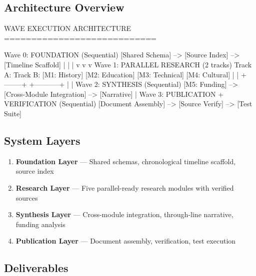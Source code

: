 \documentclass[11pt,letterpaper]{article}
\begin{document}
\subsection{Architecture Overview}

\begin{asciibox}
WAVE EXECUTION ARCHITECTURE
============================

Wave 0: FOUNDATION (Sequential)
  [Shared Schema] --> [Source Index] --> [Timeline Scaffold]
       |                   |                    |
       v                   v                    v
Wave 1: PARALLEL RESEARCH (2 tracks)
  Track A:                  Track B:
  [M1: History]             [M2: Education]
  [M3: Technical]           [M4: Cultural]
       |                         |
       +--------+    +-----------+
                |    |
Wave 2: SYNTHESIS (Sequential)
  [M5: Funding] --> [Cross-Module Integration] --> [Narrative]
                              |
Wave 3: PUBLICATION + VERIFICATION (Sequential)
  [Document Assembly] --> [Source Verify] --> [Test Suite]
\end{asciibox}

\subsection{System Layers}

\begin{enumerate}[leftmargin=2em]
\item \textbf{Foundation Layer} --- Shared schemas, chronological timeline scaffold, source index
\item \textbf{Research Layer} --- Five parallel-ready research modules with verified sources
\item \textbf{Synthesis Layer} --- Cross-module integration, through-line narrative, funding analysis
\item \textbf{Publication Layer} --- Document assembly, verification, test execution
\end{enumerate}

\subsection{Deliverables}
\end{document}
